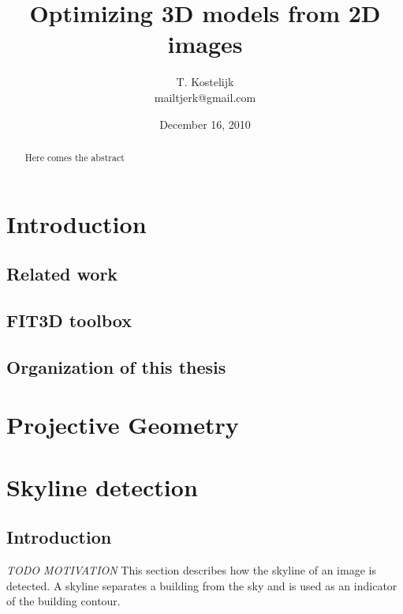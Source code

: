 \documentclass[10pt]{article}
\title{\sc Optimizing 3D models from 2D images}
\author{T. Kostelijk\\mailtjerk@gmail.com}
\date{December 16, 2010}
\begin{document}
\maketitle
\begin{abstract}
Here comes the abstract
\end{abstract}




\section{Introduction}
 \subsection{Related work}
 \subsection{FIT3D toolbox}
 \subsection{Organization of this thesis}

\section{Projective Geometry}

\section{Skyline detection}
 \subsection{Introduction}

\textit{ TODO MOTIVATION}
This section describes how the skyline of an image is detected. A skyline
separates a building from the sky and is used as an indicator of the building contour.
\\
\end{document}
